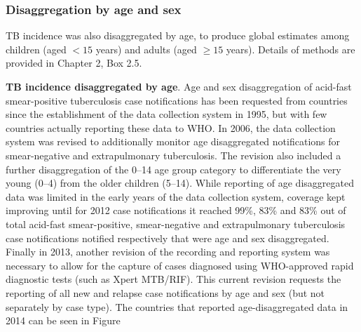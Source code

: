 \subsubsection{Disaggregation by age and sex}

TB incidence was also disaggregated by age, to produce global estimates among children (aged $< 15$ years) and adults (aged $\geq 15$ years). Details of methods are provided in Chapter 2, Box 2.5.  

\textbf{TB incidence disaggregated by age}. Age and sex disaggregation of acid-fast smear-positive tuberculosis case notifications has been requested from countries since the establishment of the data collection system in 1995, but with few countries actually reporting these data to WHO. In 2006, the data collection system was revised to additionally monitor age disaggregated notifications for smear-negative and extrapulmonary tuberculosis. The revision also included a further disaggregation of the 0–14 age group category to differentiate the very young (0–4) from the older children (5–14). While reporting of age disaggregated data was limited in the early years of the data collection system, coverage kept improving until for 2012 case notifications it reached 99\%, 83\% and 83\% out of total acid-fast smear-positive, smear-negative and extrapulmonary tuberculosis case notifications notified respectively that were age and sex disaggregated. Finally in 2013, another revision of the recording and reporting system was necessary to allow for the capture of cases diagnosed using WHO-approved rapid diagnostic tests (such as Xpert MTB/RIF). This current revision requests the reporting of all new and relapse case notifications by age and sex (but not separately by case type). The countries that reported age-disaggregated data in 2014 can be seen in Figure 